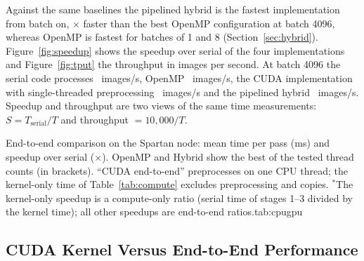 Against the same baselines the pipelined hybrid is the fastest implementation from batch  on, $\times$ faster than the best OpenMP configuration at batch 4096, whereas OpenMP is fastest for batches of 1 and 8 (Section~\ref{sec:hybrid}). Figure~\ref{fig:speedup} shows the speedup over serial of the four implementations and Figure~\ref{fig:tput} the throughput in images per second. At batch 4096 the serial code processes ~images/s, OpenMP ~images/s, the CUDA implementation with single-threaded preprocessing ~images/s and the pipelined hybrid ~images/s. Speedup and throughput are two views of the same time measurements: $S=T_{\mathrm{serial}}/T$ and throughput $=10{,}000/T$.

\begin{widetable}{End-to-end comparison on the Spartan node: mean time per pass (ms) and speedup over serial ($\times$). OpenMP and Hybrid show the best of the tested thread counts (in brackets). ``CUDA end-to-end'' preprocesses on one CPU thread; the kernel-only time of Table~\ref{tab:compute} excludes preprocessing and copies. $^{\ast}$The kernel-only speedup is a compute-only ratio (serial time of stages 1--3 divided by the kernel time); all other speedups are end-to-end ratios.}{tab:cpugpu}

\end{widetable}




\subsection{CUDA Kernel Versus End-to-End Performance}\label{sec:compute}

